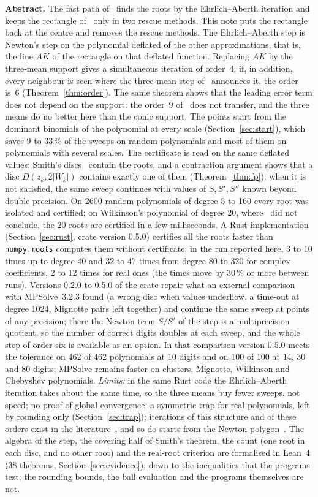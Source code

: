 \documentclass[10pt,a4paper]{article}
\theoremstyle{definition}
\numberwithin{equation}{section}
\begin{document}
\textbf{Abstract.}
The fast path of~\cite{g7} finds the roots by the Ehrlich--Aberth iteration and keeps the rectangle
of~\cite{v29} only in two rescue methods. This note puts the rectangle back at the centre and removes
the rescue methods. The Ehrlich--Aberth step is Newton's step on the polynomial deflated of the other
approximations, that is, the line $AK$ of the rectangle on that deflated function. Replacing $AK$ by
the three-mean support gives a simultaneous iteration of order~4; if, in addition, every neighbour is
seen where the three-mean step of~\cite{g2} announces it, the order is~6
(Theorem~\ref{thm:order}). The same theorem shows that the leading error term does not depend on the
support: the order~9 of~\cite{v29} does not transfer, and the three means do no better here than the
conic support. The points start from the dominant binomials of the polynomial at every scale
(Section~\ref{sec:start}), which saves 9 to 33\,\% of the sweeps on random polynomials and most of
them on polynomials with several scales. The certificate is read on the same deflated values: Smith's
discs~\cite{smith} contain the roots, and a contraction argument shows that a disc $D(z_k,2|W_k|)$
contains exactly one of them (Theorem~\ref{thm:fp}); when it is not satisfied, the same sweep continues
with values of $S,S',S''$ known beyond double precision. On 2600 random polynomials of degree 5 to 160
every root was isolated and certified; on Wilkinson's polynomial of degree 20, where~\cite{g7} did not
conclude, the 20 roots are certified in a few milliseconds. A Rust implementation
(Section~\ref{sec:rust}, crate version 0.5.0) certifies all the roots faster than \texttt{numpy.roots}
computes them without certificate: in the run reported here, 3 to 10 times up to degree 40 and 32 to 47
times from degree 80 to 320 for complex coefficients, 2 to 12 times for real ones (the times move by
30\,\% or more between runs).
Versions 0.2.0 to 0.5.0 of the crate repair what an external comparison with MPSolve~3.2.3 found
(a wrong disc when values underflow, a time-out at degree 1024, Mignotte pairs left together) and
continue the same sweep at points of any precision; there the Newton term $S/S'$ of the step is a
multiprecision quotient, so the number of correct digits doubles at each sweep, and the whole step of
order six is available as an option. In that comparison version 0.5.0 meets the tolerance on 462 of 462
polynomials at 10 digits and on 100 of 100 at 14, 30 and 80 digits; MPSolve remains faster on clusters,
Mignotte, Wilkinson and Chebyshev polynomials.
\emph{Limits:} in the same Rust code the Ehrlich--Aberth iteration takes about the same time, so
the three means buy fewer sweeps, not speed; no proof of global convergence; a symmetric trap for real
polynomials, left by rounding only (Section~\ref{sec:trap}); iterations of this structure and of
these orders exist in the literature~\cite{hpr,ppz,prp}, and so do starts from the Newton
polygon~\cite{bini}. The algebra of the step, the covering half of Smith's theorem, the count
(one root in each disc, and no other root) and the real-root criterion are formalised in Lean~4
(38 theorems, Section~\ref{sec:evidence}), down to the inequalities that the programs test; the
rounding bounds, the ball evaluation and the programs themselves are not.
\end{document}
